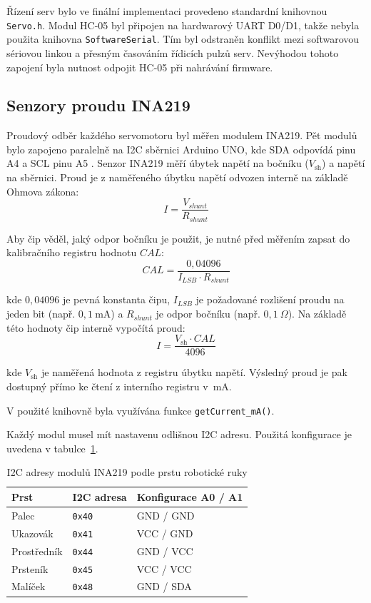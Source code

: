 \documentclass[FZS,DP]{tulthesis}
\begin{document}
Řízení serv bylo ve finální implementaci provedeno standardní knihovnou \texttt{Servo.h}. Modul HC-05 byl připojen na hardwarový UART D0/D1, takže nebyla použita knihovna \texttt{SoftwareSerial}. Tím byl odstraněn konflikt mezi softwarovou sériovou linkou a přesným časováním řídicích pulzů serv. Nevýhodou tohoto zapojení byla nutnost odpojit HC-05 při nahrávání firmware.

\subsection{Senzory proudu INA219}
\label{subsec:ina219}

Proudový odběr každého servomotoru byl měřen modulem INA219. Pět modulů bylo zapojeno paralelně na I2C sběrnici Arduino UNO, kde SDA odpovídá pinu A4 a SCL pinu A5 \cite{Lebosse2011,ti_ina219}. Senzor INA219 měří úbytek napětí na bočníku ($V_{\mathrm{sh}}$) a napětí
na sběrnici. Proud je z naměřeného úbytku napětí odvozen interně na základě
Ohmova zákona:
\begin{equation}
    I = \frac{V_{shunt}}{R_{shunt}}    
\end{equation}


Aby čip věděl, jaký odpor bočníku je použit, je nutné před měřením zapsat
do kalibračního registru hodnotu $CAL$:
\begin{equation}
    CAL = \frac{0{,}04096}{I_{LSB} \cdot R_{shunt}}
\end{equation}

kde $0{,}04096$ je pevná konstanta čipu, $I_{LSB}$ je požadované rozlišení
proudu na jeden bit (např. $0{,}1\ \mathrm{mA}$) a $R_{shunt}$ je odpor
bočníku (např. $0{,}1\ \Omega$). Na základě této hodnoty čip interně
vypočítá proud:
\begin{equation}
    I = \frac{V_{\mathrm{sh}} \cdot CAL}{4096}
\end{equation}


kde $V_{\mathrm{sh}}$ je naměřená hodnota z registru úbytku napětí.
Výsledný proud je pak dostupný přímo ke čtení z interního registru v~mA.

V použité knihovně byla využívána funkce \texttt{getCurrent\_mA()}.

Každý modul musel mít nastavenu odlišnou I2C adresu. Použitá konfigurace je uvedena v tabulce~\ref{tab:ina219}.

\begin{table}[H]
\centering
\caption{I2C adresy modulů INA219 podle prstu robotické ruky}
\label{tab:ina219}
\begin{tabular}{|p{}|p{}|p{}|}
\hline
\textbf{Prst} & \textbf{I2C adresa} & \textbf{Konfigurace A0 / A1} \\
\hline
Palec & \texttt{0x40} & GND / GND \\
\hline
Ukazovák & \texttt{0x41} & VCC / GND \\
\hline
Prostředník & \texttt{0x44} & GND / VCC \\
\hline
Prsteník & \texttt{0x45} & VCC / VCC \\
\hline
Malíček & \texttt{0x48} & GND / SDA \\
\hline
\end{tabular}
\end{table}
\end{document}

